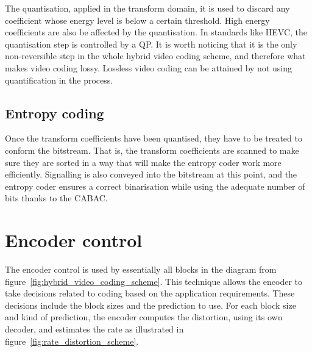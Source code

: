 \documentclass[11pt,a4paper,openright,twoside]{book}
\numberwithin{equation}{section} %
\begin{document}
The quantisation, applied in the transform domain, it is used to discard
any coefficient whose energy level is below a certain threshold.
High energy coefficients are also be affected by the quantisation.
In standards like \acs{HEVC}, the quantisation step is controlled by a
\ac{QP}.
It is worth noticing that it is the only non-reversible step in the whole
hybrid video coding scheme, and therefore what makes video coding lossy.
Lossless video coding can be attained by not using quantification in the
process.


\subsection{Entropy coding}
\label{sub:entropy_coding}

Once the transform coefficients have been quantised, they have to be
treated to conform the bitstream.
That is, the transform coefficients are scanned to make sure they are
sorted in a way that will make the entropy coder work more efficiently.
Signalling is also conveyed into the bitstream at this point, and the
entropy coder ensures a correct binarisation while using the adequate
number of bits thanks to the \ac{CABAC}.

\section{Encoder control}
\label{sec:encoder_control}

The encoder control is used by essentially all blocks in the diagram
from figure~\ref{fig:hybrid_video_coding_scheme}.
This technique allows the encoder to take decisions related to coding
based on the application requirements.
These decisions include the block sizes and the prediction to use.
For each block size and kind of prediction, the encoder computes the
distortion, using its own decoder, and estimates the rate as illustrated
in figure~\ref{fig:rate_distortion_scheme}.
\end{document}
